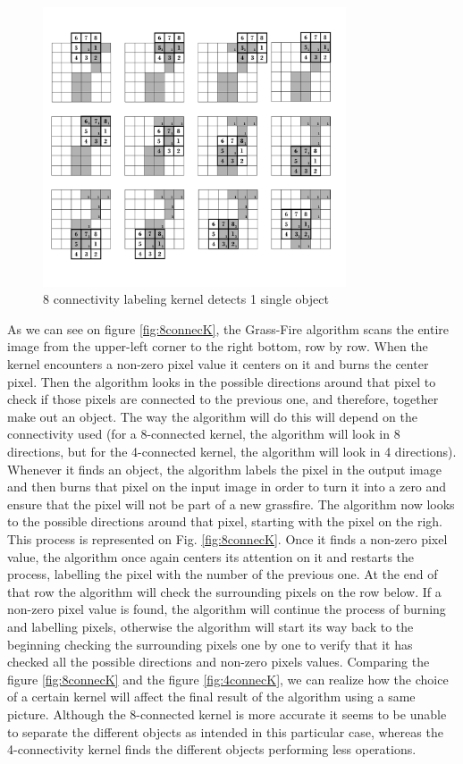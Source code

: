 \begin{figure}[htbp]
\centering
\includegraphics[width=0.8\textwidth]{Pictures/Theory/8connec_kernel.png}
\caption{8 connectivity labeling kernel detects 1 single object}
\label{fig:8connecK}
\end{figure}

As we can see on figure \eqref{fig:8connecK}, the Grass-Fire algorithm scans the entire image from the upper-left corner to the right bottom, row by row. When the kernel encounters a non-zero pixel value it centers on it and burns the center pixel. Then the algorithm looks in the possible directions around that pixel to check if those pixels are connected to the previous one, and therefore, together make out an object. The way the algorithm will do this will depend on the connectivity used (for a 8-connected kernel, the algorithm will look in 8 directions, but for the 4-connected kernel, the algorithm will look in 4 directions).
Whenever it finds an object, the algorithm labels the pixel in the output image and then burns that pixel on the input image in order to turn it into a zero and ensure that the pixel will not be part of a new grassfire.
The algorithm now looks to the possible directions around that pixel, starting with the pixel on the righ. This process is represented on Fig. \eqref{fig:8connecK}. Once it finds a non-zero pixel value, the algorithm once again centers its attention on it and restarts the process, labelling the pixel with the number of the previous one. At the end of that row the algorithm will check the surrounding pixels on the row below. If a non-zero pixel value is found, the algorithm will continue the process of burning and labelling pixels, otherwise the algorithm will start its way back to the beginning checking the surrounding pixels one by one to verify that it has checked all the possible directions and non-zero pixels values.
Comparing the figure \eqref{fig:8connecK} and the figure \eqref{fig:4connecK}, we can realize how the choice of a certain kernel will affect the final result of the algorithm using a same picture. Although the 8-connected kernel is more accurate it seems to be unable to separate the different objects as intended in this particular case, whereas the 4-connectivity kernel finds the different objects performing less operations.

